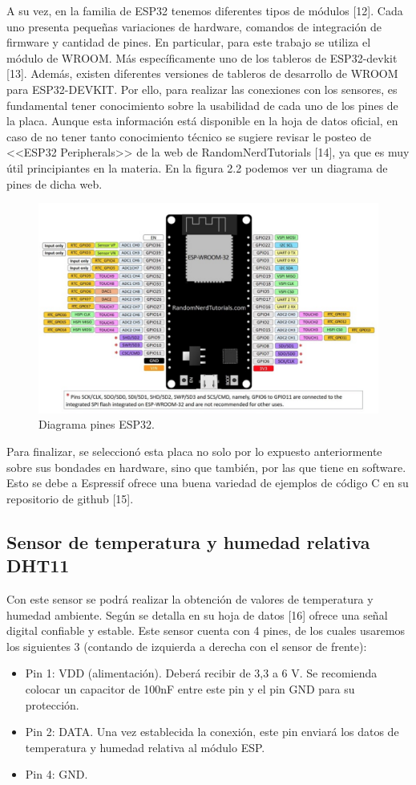 A su vez, en la familia de ESP32 tenemos diferentes tipos de módulos [12]. Cada uno presenta pequeñas variaciones de hardware, comandos de integración de firmware y cantidad de pines. En particular, para este trabajo se utiliza el módulo de WROOM. Más específicamente uno de los tableros de ESP32-devkit [13]. Además, existen diferentes versiones de tableros de desarrollo de WROOM para ESP32-DEVKIT. Por ello, para realizar las conexiones con los sensores, es fundamental tener conocimiento sobre la usabilidad de cada uno de los pines de la placa. Aunque esta información está disponible en la hoja de datos oficial, en caso de no tener tanto conocimiento técnico se sugiere revisar le posteo de <<ESP32 Peripherals>> de la web de RandomNerdTutorials [14], ya que es muy útil principiantes en la materia. En la figura 2.2 podemos ver un diagrama de pines de dicha web.

\begin{figure}[htpb]
\centering 
\includegraphics[width=.9\textwidth]{./Figures/esp32pines.png}
\caption{Diagrama pines ESP32.}
\label{fig:diagBloques}
\end{figure}

Para finalizar, se seleccionó esta placa no solo por lo expuesto anteriormente sobre sus bondades en hardware, sino que también, por las que tiene en software. Esto se debe a Espressif ofrece una buena variedad de ejemplos de código C en su repositorio de github [15].

\subsection{Sensor de temperatura y humedad relativa DHT11}
Con este sensor se podrá realizar la obtención de valores de temperatura y humedad ambiente. Según se detalla en su hoja de datos [16] ofrece una señal digital confiable y estable.
Este sensor cuenta con 4 pines, de los cuales usaremos los siguientes 3 (contando de izquierda a derecha con el sensor de frente):
\begin{itemize}
\item Pin 1: VDD (alimentación). Deberá recibir de 3,3 a 6 V. Se recomienda colocar un capacitor de 100nF entre este pin y el pin GND para su protección.
\item Pin 2: DATA. Una vez establecida la conexión, este pin enviará los datos de temperatura y humedad relativa al módulo ESP.
\item Pin 4: GND.
\end{itemize}

